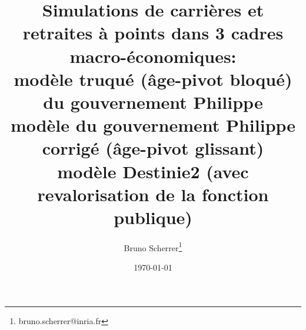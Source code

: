 \documentclass[a4paper,10pt]{report}
\title{Simulations de carrières et retraites à points dans 3 cadres macro-économiques:\\
  modèle truqué (âge-pivot bloqué) du gouvernement Philippe \\
  modèle du gouvernement Philippe corrigé (âge-pivot glissant)\\
  modèle Destinie2 (avec revalorisation de la fonction publique)}
\author{Bruno Scherrer\footnote{bruno.scherrer@inria.fr}}
\date{\today}
\begin{document}
\makeatletter
\renewcommand\tableofcontents{%
    \@starttoc{toc}%
}
\makeatother

\dominitoc


\maketitle

\doclicenseThis








\end{document}
